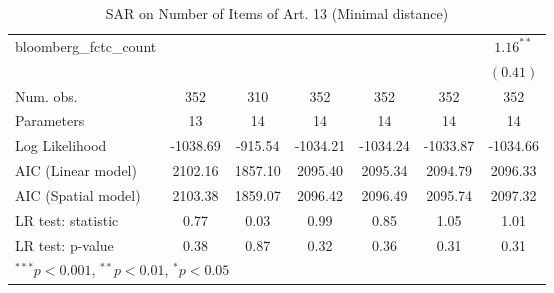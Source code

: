 \begin{table}[!h]
\begin{center}
\begin{tabular}{l c c c c c c }
bloomberg\_fctc\_count  &              &              &              &              &              & $1.16^{**}$  \\
                        &              &              &              &              &              & $(0.41)$     \\
\midrule
Num. obs.               & 352          & 310          & 352          & 352          & 352          & 352          \\
Parameters              & 13           & 14           & 14           & 14           & 14           & 14           \\
Log Likelihood          & -1038.69     & -915.54      & -1034.21     & -1034.24     & -1033.87     & -1034.66     \\
AIC (Linear model)      & 2102.16      & 1857.10      & 2095.40      & 2095.34      & 2094.79      & 2096.33      \\
AIC (Spatial model)     & 2103.38      & 1859.07      & 2096.42      & 2096.49      & 2095.74      & 2097.32      \\
LR test: statistic      & 0.77         & 0.03         & 0.99         & 0.85         & 1.05         & 1.01         \\
LR test: p-value        & 0.38         & 0.87         & 0.32         & 0.36         & 0.31         & 0.31         \\
\bottomrule
\multicolumn{7}{l}{\scriptsize{$^{***}p<0.001$, $^{**}p<0.01$, $^*p<0.05$}}
\end{tabular}
\caption{SAR on Number of Items of Art. 13 (Minimal distance)}
\label{table:coefficients}
\end{center}
\end{table}

